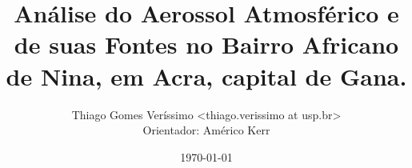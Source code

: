 \documentclass{beamer}
\begin{document}
  \title{Análise do Aerossol Atmosférico e de suas Fontes no Bairro Africano de Nina, em Acra, capital de Gana.}
  \author{Thiago Gomes Veríssimo <thiago.verissimo at usp.br> \\
          Orientador: Américo Kerr}
  \date{\today}

\begin{frame}
  \titlepage
\end{frame}

\begin{frame}
  \tableofcontents
\end{frame}




%

\end{document}
